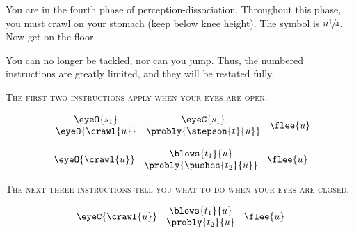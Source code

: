 You are in the fourth phase of perception-dissociation. Throughout this 
phase, you must crawl on your stomach (keep below knee height). The 
symbol is $u\sfrac{1}{4}$. Now get on the floor. 

You can no longer be tackled, nor can you jump. Thus, the numbered 
instructions are greatly limited, and they will be restated fully. 

\vfill

\textsc{The first two instructions apply when your eyes are open.}

\vfill

\begin{enumerate}
{\[\begin{array}{c c}
	\eyeO{s_1} & \eyeC{s_1} \\
	\eyeO{\crawl{u}} & \probly{\stepson{t}{u}}
\end{array} \:\: \flee{u}\]}

\vfill

		{\centering \parbox{2in}{
\item \[ \eyeO{\crawl{u}} \:\: \begin{array}{c}
		\blows{t_1}{u} \\
\probly{\pushes{t_2}{u}} \end{array} \:\: \flee{u} \]}\par}

\vfill

\textsc{The next three instructions tell you what to do when your eyes are closed.}

\vfill


\vfill

	{\[ \eyeC{\crawl{u}} \:\: \begin{array}{c}
		\blows{t_1}{u} \\
	\probly{t_2}{u} \end{array} \:\:
		\flee{u} \]}


\end{enumerate}
